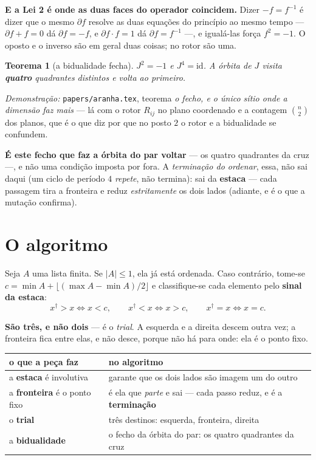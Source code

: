 \documentclass[11pt,a4paper]{article}
\newcommand{\code}[1]{\texttt{\small #1}}
\newtheorem{teorema}{Teorema}
\begin{document}
\medskip\noindent\textbf{E a Lei 2 é onde as duas faces do operador coincidem.}
Dizer $-f=f^{-1}$ é dizer que o mesmo $\partial f$ resolve as duas equações do
princípio ao mesmo tempo --- $\partial f+f=0$ dá $\partial f=-f$, e
$\partial f\cdot f=1$ dá $\partial f=f^{-1}$ ---, e igualá-las força
$f^{2}=-1$. O oposto e o inverso são em geral duas coisas; no rotor são uma.

\begin{teorema}[a bidualidade fecha]
$J^{2}=-1$ e $J^{4}=\mathrm{id}$. A órbita de $J$ visita \textbf{quatro} quadrantes distintos e
volta ao primeiro.
\end{teorema}

\noindent\emph{Demonstração:} \code{papers/aranha.tex}, teorema \emph{o fecho,
e o único sítio onde a dimensão faz mais} --- lá com o rotor
$R_{ij}$ no plano coordenado e a contagem $\binom{n}{2}$ dos planos, que é o que
diz por que no posto $2$ o rotor e a bidualidade se confundem.

\noindent \textbf{É este fecho que faz a órbita do par voltar} --- os quatro quadrantes da cruz ---, e
não uma condição imposta por fora. A \emph{terminação do ordenar}, essa, não sai daqui (um ciclo de
período $4$ \emph{repete}, não termina): sai da \textbf{estaca} --- cada passagem tira a fronteira e
reduz \emph{estritamente} os dois lados (adiante, e é o que a mutação confirma).

\section{O algoritmo}

Seja $A$ uma lista finita. Se $|A|\leq 1$, ela já está ordenada. Caso contrário, tome-se
$c=\min A+\lfloor(\max A-\min A)/2\rfloor$ e classifique-se cada elemento pelo \textbf{sinal da
estaca}:
\[
  x^{\dagger}>x \iff x<c, \qquad
  x^{\dagger}<x \iff x>c, \qquad
  x^{\dagger}=x \iff x=c .
\]

\noindent \textbf{São três, e não dois} --- é o \emph{trial}. A esquerda e a direita descem outra
vez; a fronteira fica entre elas, e não desce, porque não há para onde: ela é o ponto fixo.

\begin{center}\small
\begin{tabular}{@{}ll@{}}
\toprule
o que a peça faz & no algoritmo \\
\midrule
a \textbf{estaca} é involutiva & garante que os dois lados são imagem um do outro \\
a \textbf{fronteira} é o ponto fixo & é ela que \emph{parte} e sai --- cada passo reduz, e é a \textbf{terminação} \\
o \textbf{trial} & três destinos: esquerda, fronteira, direita \\
a \textbf{bidualidade} & o fecho da órbita do par: os quatro quadrantes da cruz \\
\bottomrule
\end{tabular}
\end{center}
\end{document}
